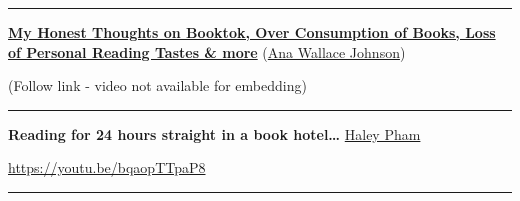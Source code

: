 \documentclass[
  letterpaper,
  DIV=11,
  numbers=noendperiod,
  oneside]{scrartcl}
\begin{document}
\begin{center}\rule{0.5\linewidth}{0.5pt}\end{center}

\href{https://youtu.be/DwOpkhxexcA}{\textbf{My Honest Thoughts on
Booktok, Over Consumption of Books, Loss of Personal Reading Tastes \&
more}} (\href{https://www.youtube.com/@AnaWallaceJohnson/videos}{Ana
Wallace Johnson})

(Follow link - video not available for embedding)

\begin{center}\rule{0.5\linewidth}{0.5pt}\end{center}

\textbf{Reading for 24 hours straight in a book hotel\ldots{}}
\href{https://www.youtube.com/@haleypham/videos}{Haley Pham}

\url{https://youtu.be/bqaopTTpaP8}

\begin{center}\rule{0.5\linewidth}{0.5pt}\end{center}
\end{document}
